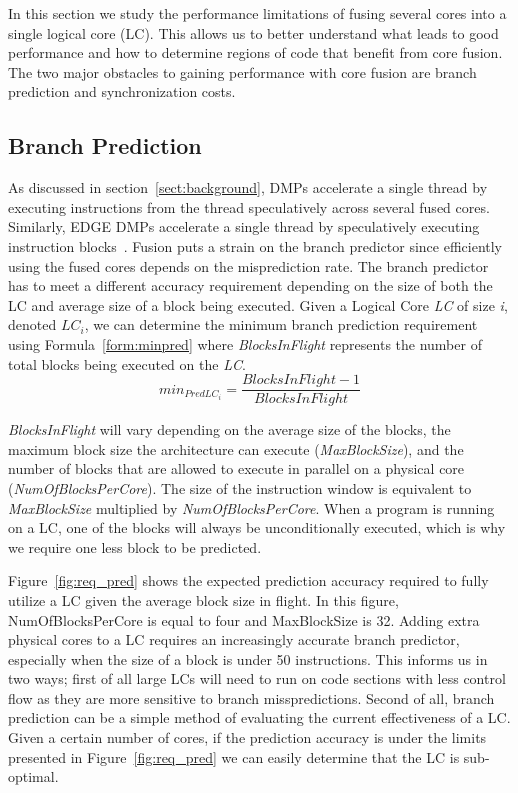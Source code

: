 In this section we study the performance limitations of fusing several cores into a single logical core (LC).
This allows us to better understand what leads to good performance and how to determine regions of code that benefit from core fusion.
The two major obstacles to gaining performance with core fusion are branch prediction and synchronization costs.

\subsection{Branch Prediction}

As discussed in section~\ref{sect:background}, DMPs accelerate a single thread by executing instructions from the thread speculatively across several fused cores. 
Similarly, EDGE DMPs accelerate a single thread by speculatively executing instruction blocks~\cite{pricopi2012bahurupi, putnam2010e2}.
Fusion puts a strain on the branch predictor since efficiently using the fused cores depends on the misprediction rate.
The branch predictor has to meet a different accuracy requirement depending on the size of both the LC and average size of a block being executed.
Given a Logical Core \textit{LC} of size \textit{i}, denoted \textit{$LC_i$}, we can determine the minimum branch prediction requirement using Formula~\ref{form:minpred} where \textit{BlocksInFlight} represents the number of total blocks being executed on the \textit{LC}.
\begin{equation}\label{form:minpred}
min_{PredLC_i }= \frac{BlocksInFlight - 1}{BlocksInFlight}
\end{equation}
\vspace{5mm}

\textit{BlocksInFlight} will vary depending on the average size of the blocks, the maximum block size the architecture can execute (\textit{MaxBlockSize}), and the number of blocks 
that are allowed to execute in parallel on a physical core (\textit{NumOfBlocksPerCore}). 
The size of the instruction window is equivalent to \textit{MaxBlockSize} multiplied by \textit{NumOfBlocksPerCore}.
When a program is running on a LC, one of the blocks will always be unconditionally executed, which is why we require one less block to be predicted.

Figure~\ref{fig:req_pred} shows the expected prediction accuracy required to fully utilize a LC given the average block size in flight.
In this figure, NumOfBlocksPerCore is equal to four and MaxBlockSize is 32.
Adding extra physical cores to a LC requires an increasingly accurate branch predictor, especially when the size of a block is under 50 instructions.
This informs us in two ways; first of all large LCs will need to run on code sections with less control flow as they are more sensitive to branch misspredictions.
Second of all, branch prediction can be a simple method of evaluating the current effectiveness of a LC.
Given a certain number of cores, if the prediction accuracy is under the limits presented in Figure~\ref{fig:req_pred} we can easily determine that the LC is sub-optimal.


